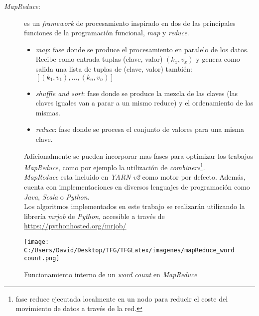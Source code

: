 \begin{description}
  \item[\textit{MapReduce}:] es un \textit{framework} de procesamiento inspirado 
  en dos de las principales funciones de la programación funcional, \textit{map} y \textit{reduce}.
  \begin{itemize}
    \item \textit{map}: fase donde se produce el procesamiento en paralelo de los datos. 
          Recibe como entrada tuplas (clave, valor) $(k_x, v_x)$ y genera como salida 
          una lista de tuplas de (clave, valor) también: $[(k_1, v_1), \ldots, (k_n, v_n)]$
    \item \textit{shuffle and sort}: fase donde se produce la mezcla de las claves 
          (las claves iguales van a parar a un mismo reduce) y el ordenamiento de las mismas.
    \item \textit{reduce}: fase donde se procesa el conjunto de valores para una misma clave.
  \end{itemize}
  Adicionalmente se pueden incorporar mas fases para optimizar los trabajos \textit{MapReduce}, como por
  ejemplo la utilización de \textit{combiners}\footnote{fase reduce ejecutada localmente
  en un nodo para reducir el coste del movimiento de datos a través de la red.}.\\
  \textit{MapReduce} esta incluido en \textit{YARN v2} como motor por defecto. Además, cuenta con implementaciones en 
  diversos lenguajes de programación como \textit{Java}, \textit{Scala} o \textit{Python}.\\
  Los algoritmos implementados en este trabajo se realizarán utilizando la librería \textit{mrjob} 
  de \textit{Python}, accesible a través de \url{https://pythonhosted.org/mrjob/}
\end{description}

\begin{figure}[!htpb]
  \centering
  \texttt{[image: C:/Users/David/Desktop/TFG/TFGLatex/imagenes/mapReduce\_wordcount.png]}
  \caption[Conteo de palabras en \textit{MapReduce}]{Funcionamiento interno de un \textit{word count} en \textit{MapReduce}}
  \label{mapReduce_wordcount}
\end{figure}

\clearpage

